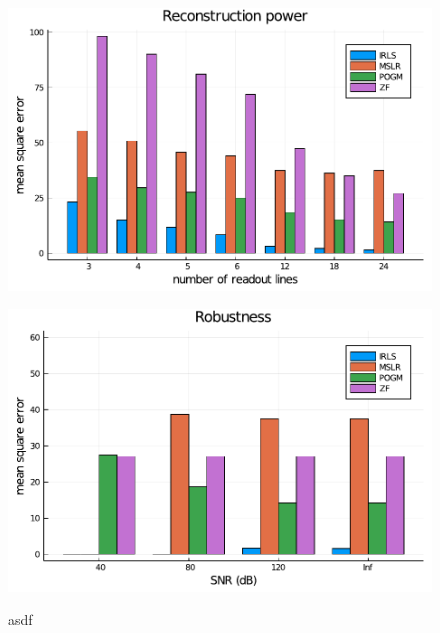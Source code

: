 \begin{figure}
    \centering
    \begin{minipage}{0.48\linewidth}
        \centering
        \includegraphics[width=\linewidth]{images/reconstruction_power.pdf}
        \label{fig:reconstruction_power}
    \end{minipage}
    \begin{minipage}{0.48\linewidth}
        \centering
        \includegraphics[width=\linewidth]{images/noise_tolerance.pdf}
        \label{fig:noise_tolerance}
    \end{minipage}
    \caption{asdf}
    \label{fig:IRLS_analysis}
\end{figure}

